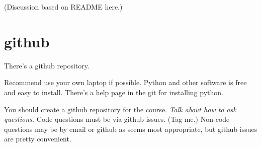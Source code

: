 (Discussion based on README here.)

\section*{github}

There's a github repository.

Recommend use your own laptop if possible.  Python and other software
is free and easy to install.  There's a help page in the git for
installing python.

You should create a github repository for the course.  \textit{Talk
  about how to ask questions.}  Code questions must be via github
issues.  (Tag me.)  Non-code questions may be by email or github as
seems most appropriate, but github issues are pretty convenient.


